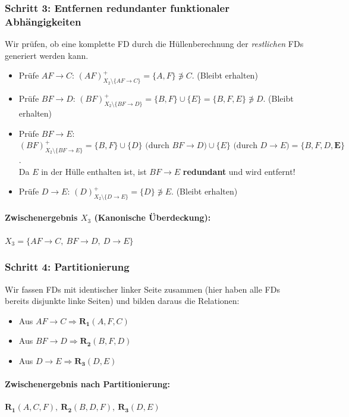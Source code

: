 \documentclass[12pt]{scrartcl}
\begin{document}
\subsubsection*{Schritt 3: Entfernen redundanter funktionaler Abhängigkeiten}
Wir prüfen, ob eine komplette FD durch die Hüllenberechnung der \textit{restlichen} FDs generiert werden kann.
\begin{itemize}
    \item Prüfe $AF \rightarrow C$: $(AF)^+_{X_2 \setminus \{AF \rightarrow C\}} = \{A, F\} \not\ni C$. (Bleibt erhalten)
    \item Prüfe $BF \rightarrow D$: $(BF)^+_{X_2 \setminus \{BF \rightarrow D\}} = \{B, F\} \cup \{E\} = \{B, F, E\} \not\ni D$. (Bleibt erhalten)
    \item Prüfe \textbf{$BF \rightarrow E$}: $(BF)^+_{X_2 \setminus \{BF \rightarrow E\}} = \{B, F\} \cup \{D\} \text{ (durch } BF \rightarrow D) \cup \{E\} \text{ (durch } D \rightarrow E) = \{B, F, D, \mathbf{E}\}$. \\
    Da $E$ in der Hülle enthalten ist, ist $BF \rightarrow E$ \textbf{redundant} und wird entfernt!
    \item Prüfe $D \rightarrow E$: $(D)^+_{X_2 \setminus \{D \rightarrow E\}} = \{D\} \not\ni E$. (Bleibt erhalten)
\end{itemize}
\paragraph{Zwischenergebnis $X_3$ (Kanonische Überdeckung):}
$X_3 = \{AF \rightarrow C,\ BF \rightarrow D,\ D \rightarrow E\}$

\subsubsection*{Schritt 4: Partitionierung}
Wir fassen FDs mit identischer linker Seite zusammen (hier haben alle FDs bereits disjunkte linke Seiten) und bilden daraus die Relationen:
\begin{itemize}
    \item Aus $AF \rightarrow C \Rightarrow \mathbf{R_1}(A, F, C)$
    \item Aus $BF \rightarrow D \Rightarrow \mathbf{R_2}(B, F, D)$
    \item Aus $D \rightarrow E \Rightarrow \mathbf{R_3}(D, E)$
\end{itemize}
\paragraph{Zwischenergebnis nach Partitionierung:}
$\mathbf{R_1}(A, C, F),\ \mathbf{R_2}(B, D, F),\ \mathbf{R_3}(D, E)$
\end{document}
